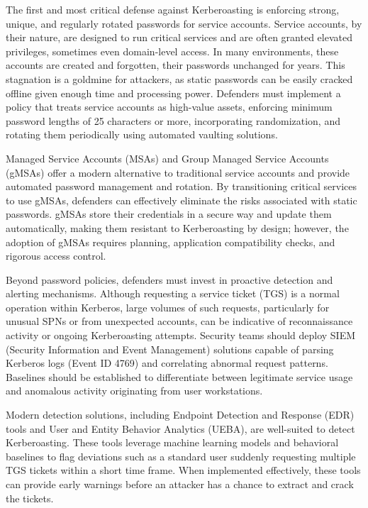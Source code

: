 The first and most critical defense against Kerberoasting is enforcing strong, unique, and regularly rotated passwords for service accounts. Service accounts, by their nature, are designed to run critical services and are often granted elevated privileges, sometimes even domain-level access. In many environments, these accounts are created and forgotten, their passwords unchanged for years. This stagnation is a goldmine for attackers, as static passwords can be easily cracked offline given enough time and processing power. Defenders must implement a policy that treats service accounts as high-value assets, enforcing minimum password lengths of 25 characters or more, incorporating randomization, and rotating them periodically using automated vaulting solutions.

Managed Service Accounts (MSAs) and Group Managed Service Accounts (gMSAs) offer a modern alternative to traditional service accounts and provide automated password management and rotation. By transitioning critical services to use gMSAs, defenders can effectively eliminate the risks associated with static passwords. gMSAs store their credentials in a secure way and update them automatically, making them resistant to Kerberoasting by design; however, the adoption of gMSAs requires planning, application compatibility checks, and rigorous access control.

Beyond password policies, defenders must invest in proactive detection and alerting mechanisms. Although requesting a service ticket (TGS) is a normal operation within Kerberos, large volumes of such requests, particularly for unusual SPNs or from unexpected accounts, can be indicative of reconnaissance activity or ongoing Kerberoasting attempts. Security teams should deploy SIEM (Security Information and Event Management) solutions capable of parsing Kerberos logs (Event ID 4769) and correlating abnormal request patterns. Baselines should be established to differentiate between legitimate service usage and anomalous activity originating from user workstations.

Modern detection solutions, including Endpoint Detection and Response (EDR) tools and User and Entity Behavior Analytics (UEBA), are well-suited to detect Kerberoasting. These tools leverage machine learning models and behavioral baselines to flag deviations such as a standard user suddenly requesting multiple TGS tickets within a short time frame. When implemented effectively, these tools can provide early warnings before an attacker has a chance to extract and crack the tickets.

